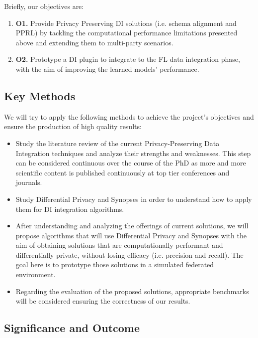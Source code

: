 \documentclass[12pt]{article}
\begin{document}
Briefly, our objectives are:
\begin{enumerate}
   \item \textbf{O1.} Provide Privacy Preserving DI solutions (i.e. schema alignment and PPRL) by tackling the computational performance limitations 
   presented above and extending them to multi-party scenarios.
   \item \textbf{O2.} Prototype a DI plugin to integrate to the FL data integration phase, with the aim of improving the 
   learned models' performance.
\end{enumerate}

\subsection{Key Methods}
We will try to apply the following methods to achieve the
project's objectives and ensure the production of high quality results:
\begin{itemize}
   \item Study the literature review of the current Privacy-Preserving Data Integration techniques and analyze their strengths 
   and weaknesses. This step can be considered continuous over the course of the PhD as more and more scientific content is 
   published continuously at top tier conferences and journals.%
   \item Study Differential Privacy and Synopses in order to understand how to apply them for DI integration algorithms.
   \item After understanding and analyzing the offerings of current solutions, we will propose algorithms that will 
   use Differential Privacy and Synopses with the aim of obtaining solutions that are computationally performant and differentially 
   private, without losing efficacy (i.e. precision and recall). 
   The goal here is to prototype those solutions in a simulated federated environment.
   \item Regarding the evaluation of the proposed solutions, appropriate benchmarks will be considered
   ensuring the correctness of our results.
\end{itemize}

\subsection{Significance and Outcome}
\end{document}
